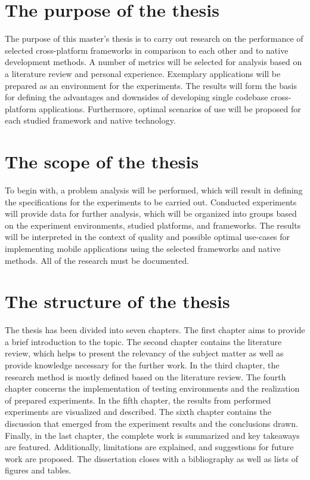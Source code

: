 
\section{The purpose of the thesis}

The purpose of this master's thesis is to carry out research on the performance of selected cross-platform frameworks in comparison to each other and to native development methods. A number of metrics will be selected for analysis based on a literature review and personal experience. Exemplary applications will be prepared as an environment for the experiments. The results will form the basis for defining the advantages and downsides of developing single codebase cross-platform applications. Furthermore, optimal scenarios of use will be proposed for each studied framework and native technology.

\section{The scope of the thesis}

To begin with, a problem analysis will be performed, which will result in defining the specifications for the experiments to be carried out. Conducted experiments will provide data for further analysis, which will be organized into groups based on the experiment environments, studied platforms, and frameworks. The results will be interpreted in the context of quality and possible optimal use-cases for implementing mobile applications using the selected frameworks and native methods. All of the research must be documented.

\section{The structure of the thesis}

The thesis has been divided into seven chapters. The first chapter aims to provide a brief introduction to the topic. The second chapter contains the literature review, which helps to present the relevancy of the subject matter as well as provide knowledge necessary for the further work. In the third chapter, the research method is mostly defined based on the literature review. The fourth chapter concerns the implementation of testing environments and the realization of prepared experiments. In the fifth chapter, the results from performed experiments are visualized and described. The sixth chapter contains the discussion that emerged from the experiment results and the conclusions drawn. Finally, in the last chapter, the complete work is summarized and key takeaways are featured. Additionally, limitations are explained, and suggestions for future work are proposed. The dissertation closes with a bibliography as well as lists of figures and tables.
